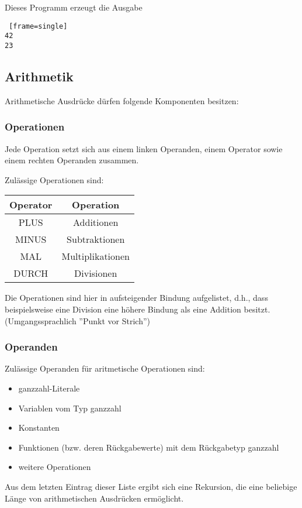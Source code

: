 \documentclass[12pt, a4paper, oneside, ngerman]{article}
\begin{document}
\noindent
Dieses Programm erzeugt die Ausgabe 
\begin{lstlisting} [frame=single] 
42
23
\end{lstlisting} 


\subsection{Arithmetik}
Arithmetische Ausdrücke dürfen folgende Komponenten besitzen:

\subsubsection{Operationen}
Jede Operation setzt sich aus einem linken Operanden, einem Operator sowie einem rechten Operanden zusammen.

Zulässige Operationen sind:
\begin{center}
  \begin{tabular}{ | c | c | }
    \hline
    Operator & Operation\\ \hline \hline
    PLUS & Additionen\\ \hline
    MINUS & Subtraktionen\\ \hline
    MAL & Multiplikationen\\ \hline
    DURCH & Divisionen\\ \hline
  \end{tabular}
\end{center}
Die Operationen sind hier in aufsteigender Bindung aufgelistet, d.h., dass beispielsweise eine Division eine höhere Bindung als eine Addition besitzt. (Umgangssprachlich ''Punkt vor Strich'')

\subsubsection{Operanden}
Zulässige Operanden für aritmetische Operationen sind:

\begin{itemize}
\item ganzzahl-Literale
\item Variablen vom Typ ganzzahl
\item Konstanten
\item Funktionen (bzw. deren Rückgabewerte) mit dem Rückgabetyp ganzzahl
\item weitere Operationen
\end{itemize}

Aus dem letzten Eintrag dieser Liste ergibt sich eine Rekursion, die eine beliebige Länge von arithmetischen Ausdrücken ermöglicht.
\end{document}
